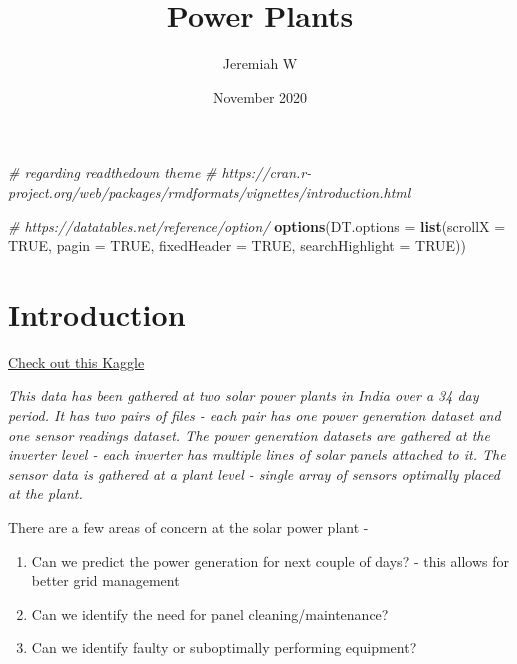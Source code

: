 \documentclass[]{tufte-handout}
\title{Power Plants}
\author{Jeremiah W}
\date{November 2020}
\newenvironment{Shaded}{}{}
\newcommand{\CommentTok}[1]{\textcolor[rgb]{0.38,0.63,0.69}{\textit{#1}}}
\newcommand{\DataTypeTok}[1]{\textcolor[rgb]{0.56,0.13,0.00}{#1}}
\newcommand{\KeywordTok}[1]{\textcolor[rgb]{0.00,0.44,0.13}{\textbf{#1}}}
\newcommand{\NormalTok}[1]{#1}
\newcommand{\OtherTok}[1]{\textcolor[rgb]{0.00,0.44,0.13}{#1}}
\providecommand{\tightlist}{%
  \setlength{\itemsep}{0pt}\setlength{\parskip}{0pt}}
\begin{document}
\maketitle




\begin{Shaded}
\begin{Highlighting}[]
\CommentTok{\# regarding \textquotesingle{}readthedown\textquotesingle{} theme}
\CommentTok{\# https://cran.r{-}project.org/web/packages/rmdformats/vignettes/introduction.html}
\end{Highlighting}
\end{Shaded}

\begin{Shaded}
\begin{Highlighting}[]
\CommentTok{\# https://datatables.net/reference/option/}
\KeywordTok{options}\NormalTok{(}\DataTypeTok{DT.options =} \KeywordTok{list}\NormalTok{(}\DataTypeTok{scrollX =} \OtherTok{TRUE}\NormalTok{, }\DataTypeTok{pagin =} \OtherTok{TRUE}\NormalTok{, }\DataTypeTok{fixedHeader =} \OtherTok{TRUE}\NormalTok{, }\DataTypeTok{searchHighlight =} \OtherTok{TRUE}\NormalTok{))}
\end{Highlighting}
\end{Shaded}

\hypertarget{introduction}{%
\section{Introduction}\label{introduction}}

\href{https://www.kaggle.com/anikannal/solar-power-generation-data}{Check
out this Kaggle}

\emph{This data has been gathered at two solar power plants in India
over a 34 day period. It has two pairs of files - each pair has one
power generation dataset and one sensor readings dataset. The power
generation datasets are gathered at the inverter level - each inverter
has multiple lines of solar panels attached to it. The sensor data is
gathered at a plant level - single array of sensors optimally placed at
the plant.}

There are a few areas of concern at the solar power plant -

\begin{enumerate}
\def\labelenumi{\arabic{enumi}.}
\tightlist
\item
  Can we predict the power generation for next couple of days? - this
  allows for better grid management
\item
  Can we identify the need for panel cleaning/maintenance?
\item
  Can we identify faulty or suboptimally performing equipment?
\end{enumerate}
\end{document}

